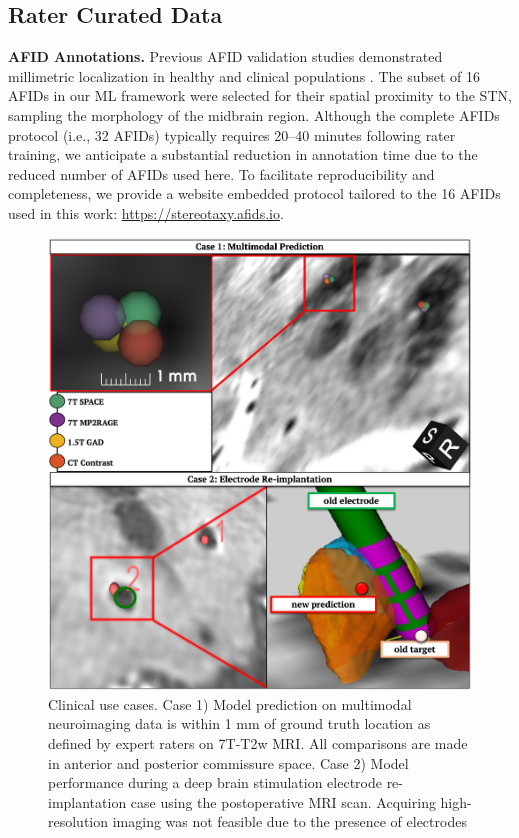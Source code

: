 \subsection{Rater Curated Data}
\textbf{AFID Annotations.} Previous AFID validation studies demonstrated millimetric localization in healthy \cite{Lau2019-eh} and clinical populations \cite{Abbass2022-lf}. The subset of 16 AFIDs in our ML framework were selected for their spatial proximity to the STN, sampling the morphology of the midbrain region. Although the complete AFIDs protocol (i.e., 32 AFIDs) typically requires 20–40 minutes following rater training, we anticipate a substantial reduction in annotation time due to the reduced number of AFIDs used here. To facilitate reproducibility and completeness, we provide a website embedded protocol tailored to the 16 AFIDs used in this work: \url{https://stereotaxy.afids.io}.
\begin{figure}[hbt!]
    \centering
    \includegraphics[width=1\linewidth]{figs/ch4_Figure_clincase.png}
    \caption{Clinical use cases. Case 1) Model prediction on multimodal neuroimaging data is within 1 mm of ground truth location as defined by expert raters on 7T-T2w MRI. All comparisons are made in anterior and posterior commissure space. Case 2) Model performance during a deep brain stimulation electrode re-implantation case using the postoperative MRI scan. Acquiring high-resolution imaging was not feasible due to the presence of electrodes}
    \label{fig:ch4_Figure_clincase}
\end{figure}

